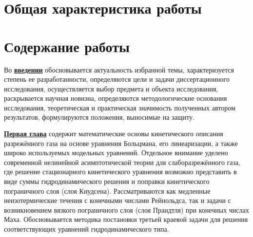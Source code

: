 
\section*{Общая характеристика работы}

\newcommand{\actuality}{\underline{\textbf{\actualityTXT}}}
\newcommand{\progress}{\underline{\textbf{\progressTXT}}}
\newcommand{\aim}{\underline{{\textbf\aimTXT}}}
\newcommand{\tasks}{\underline{\textbf{\tasksTXT}}}
\newcommand{\novelty}{\underline{\textbf{\noveltyTXT}}}
\newcommand{\influence}{\underline{\textbf{\influenceTXT}}}
\newcommand{\methods}{\underline{\textbf{\methodsTXT}}}
\newcommand{\defpositions}{\underline{\textbf{\defpositionsTXT}}}
\newcommand{\reliability}{\underline{\textbf{\reliabilityTXT}}}
\newcommand{\probation}{\underline{\textbf{\probationTXT}}}
\newcommand{\contribution}{\underline{\textbf{\contributionTXT}}}
\newcommand{\publications}{\underline{\textbf{\publicationsTXT}}}
\newcommand{\object}{\underline{\textbf{\objectTXT}}}
\newcommand{\subject}{\underline{\textbf{\subjectTXT}}}




\section*{Содержание работы}

Во \underline{\textbf{введении}} обосновывается актуальность избранной темы, характеризуется степень ее разработанности,
определяются цели и задачи диссертационного исследования, осуществляется выбор предмета и объекта исследования,
раскрывается научная новизна, определяются методологические основания исследования,
теоретическая и практическая значимость полученных автором результатов,
формулируются положения, выносимые на защиту.

\underline{\textbf{Первая глава}} содержит математические основы кинетического описания разрежённого газа
на основе уравнения Больцмана, его линеаризации, а также широко используемых модельных уравнений.
Отдельное внимание уделено современной нелинейной асимптотической теории для слаборазрежённого газа,
где решение стационарного кинетического уравнения возможно представить в виде суммы
гидродинамического решения и поправки кинетического пограничного слоя (слоя Кнудсена).
Рассматриваются как медленные неизотермические течения с конечными числами Рейнольдса,
так и задачи с возникновением вязкого пограничного слоя (слоя Прандтля) при конечных числах Маха.
Обосновывается методика постановки третьей краевой задачи для решения
соответствующих уравнений гидродинамического типа.

